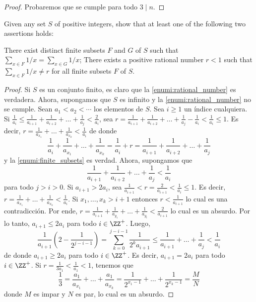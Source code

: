\begin{proof}
	Probaremos que se cumple para todo $3\mid n$.
\end{proof}

\begin{probMB}
	Given any set $S$ of positive integers, show that at least one of the following two assertions holds:
	\begin{enumerate}[(1)]
		\ii \label{enumi:finite_subsets} There exist distinct finite subsets $F$ and $G$ of $S$ such that $\sum_{x\in F}1/x=\sum_{x\in G}1/x$;
		\ii \label{enumi:rational_number} There exists a positive rational number $r<1$ such that $\sum_{x\in F}1/x\ne r$ for all finite subsets $F$ of $S$.
	\end{enumerate}
\end{probMB}

\begin{proof}
	Si $S$ es un conjunto finito, es claro que la \ref{enumi:rational_number} es verdadera. Ahora, supongamos que $S$ es infinito y la \ref{enumi:rational_number} no se cumple. Sean $a_1<a_2<\cdots$ los elementos de $S$. Sea $i\ge 1$ un índice cualquiera. Si $\frac{1}{a_i}\le\frac{1}{a_{i+1}}+\frac{1}{a_{i+2}}+\dots+\frac{1}{a_j}<\frac{2}{a_i}$, sea $r=\frac{1}{a_{i+1}}+\frac{1}{a_{i+2}}+\dots+\frac{1}{a_j}-\frac{1}{a_i}<\frac{1}{a_i}\le 1$. Es decir, $r=\frac{1}{a_{x_1}}+\dots+\frac{1}{a_{x_k}}<\frac{1}{a_i}$ de donde
	\[\frac{1}{a_i}+\frac{1}{a_{x_1}}+\dots+\frac{1}{a_{x_k}}=\frac{1}{a_i}+r=\frac{1}{a_{i+1}}+\frac{1}{a_{i+2}}+\dots+\frac{1}{a_j}\]
	y la \ref{enumi:finite_subsets} es verdad. Ahora, supongamos que
	\[\frac{1}{a_{i+1}}+\frac{1}{a_{i+2}}+\dots+\frac{1}{a_j}<\frac{1}{a_i}\]
	para todo $j>i>0$. Si $a_{i+1}>2a_i$, sea $\frac{1}{a_{i+1}}<r=\frac{2}{a_{i+1}}<\frac{1}{a_i}\le 1$. Es decir, $r=\frac{1}{a_{x_1}}+\dots+\frac{1}{a_{x_k}}<\frac{1}{a_i}$. Si $x_1,\dots,x_k>i+1$ entonces $r<\frac{1}{a_{i+1}}$ lo cual es una contradicción. Por ende, $r=\frac{1}{a_{i+1}}+\frac{1}{a_{y_1}}+\dots+\frac{1}{a_{y_l}}<\frac{2}{a_{i+1}}$ lo cual es un absurdo. Por lo tanto, $a_{i+1}\le 2a_i$ para todo $i\in\ZZ^+$. Luego, \[\frac{1}{a_{i+1}}\left(2-\frac{1}{2^{j-i-1}}\right)=\sum_{k=0}^{j-i-1}\frac{1}{2^ka_{i+1}}\le\frac{1}{a_{i+1}}+\dots+\frac{1}{a_j}<\frac{1}{a_i}\]
	de donde $a_{i+1}\ge 2a_i$ para todo $i\in\ZZ^+$. Es decir, $a_{i+1}=2a_i$ para todo $i\in\ZZ^+$. Si $r=\frac{1}{3a_1}<\frac{1}{a_1}<1$, tenemos que
	\[\frac{1}{3}=\frac{a_1}{a_{x_1}}+\dots+\frac{a_1}{a_{x_k}}=\frac{1}{2^{x_1-1}}+\dots+\frac{1}{2^{x_k-1}}=\frac{M}{N}\]
	donde $M$ es impar y $N$ es par, lo cual es un absurdo.
\end{proof}

